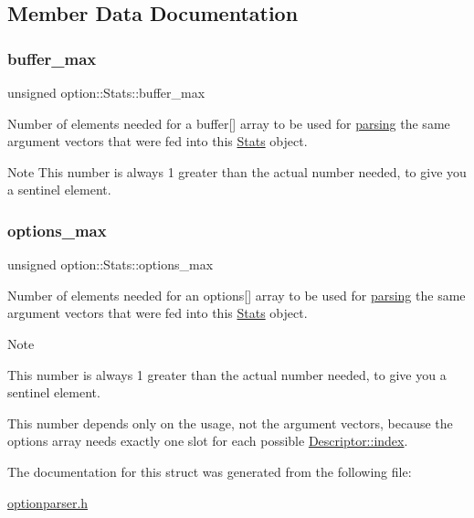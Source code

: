 \subsection{Member Data Documentation}
\mbox{\label{structoption_1_1_stats_a2c9a7b4174f91ba8bcadaa9ad6f0db06}} 
\subsubsection{\texorpdfstring{buffer\+\_\+max}{buffer\_max}}
{\footnotesize\ttfamily unsigned option\+::\+Stats\+::buffer\+\_\+max}



Number of elements needed for a {\ttfamily buffer}\mbox{[}\mbox{]} array to be used for \hyperlink{classoption_1_1_parser_a6e0b5778d1cfbd6cd51240e74d01e138}{parsing} the same argument vectors that were fed into this \hyperlink{structoption_1_1_stats}{Stats} object. 

\begin{DoxyNote}{Note}
This number is always 1 greater than the actual number needed, to give you a sentinel element. 
\end{DoxyNote}
\mbox{\label{structoption_1_1_stats_a8121787feb1c7db84fca3ccb012b0473}} 
\subsubsection{\texorpdfstring{options\+\_\+max}{options\_max}}
{\footnotesize\ttfamily unsigned option\+::\+Stats\+::options\+\_\+max}



Number of elements needed for an {\ttfamily options}\mbox{[}\mbox{]} array to be used for \hyperlink{classoption_1_1_parser_a6e0b5778d1cfbd6cd51240e74d01e138}{parsing} the same argument vectors that were fed into this \hyperlink{structoption_1_1_stats}{Stats} object. 

\begin{DoxyNote}{Note}
\begin{DoxyItemize}
\item This number is always 1 greater than the actual number needed, to give you a sentinel element. \item This number depends only on the {\ttfamily usage}, not the argument vectors, because the {\ttfamily options} array needs exactly one slot for each possible \hyperlink{structoption_1_1_descriptor_a1fee8ac44f529c99ac2b1149b4c391b1}{Descriptor\+::index}. \end{DoxyItemize}

\end{DoxyNote}


The documentation for this struct was generated from the following file\+:\begin{DoxyCompactItemize}
\item 
\hyperlink{optionparser_8h}{optionparser.\+h}\end{DoxyCompactItemize}
